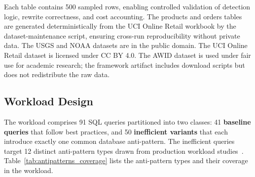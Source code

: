\documentclass[conference]{IEEEtran}
\begin{document}
\begin{table}[t]
\caption{Dataset Characteristics}
\label{tab:datasets}
\centering
{}
\end{table}

Each table contains 500 sampled rows, enabling controlled validation of detection logic, rewrite correctness, and cost accounting. The products and orders tables are generated deterministically from the UCI Online Retail workbook by the dataset-maintenance script, ensuring cross-run reproducibility without private data. The USGS and NOAA datasets are in the public domain. The UCI Online Retail dataset is licensed under CC BY 4.0. The AWID dataset is used under fair use for academic research; the framework artifact includes download scripts but does not redistribute the raw data.

\subsection{Workload Design}
\label{sec:workload}
The workload comprises 91 SQL queries partitioned into two classes: 41 \textbf{baseline queries} that follow best practices, and 50 \textbf{inefficient variants} that each introduce exactly one common database anti-pattern. The inefficient queries target 12 distinct anti-pattern types drawn from production workload studies~\cite{bress2025snowflake,gcpantipattern}. Table~\ref{tab:antipatterns_coverage} lists the anti-pattern types and their coverage in the workload.
\end{document}
